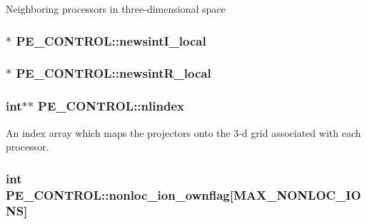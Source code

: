 Neighboring processors in three-\/dimensional space \hypertarget{struct_p_e___c_o_n_t_r_o_l_a4f6410bdeacd2bcf0fc6595132e09d6f}{
\subsubsection[{newsint\-I\-\_\-local}]{$\ast$ P\-E\-\_\-\-C\-O\-N\-T\-R\-O\-L\-::newsint\-I\-\_\-local}}\label{struct_p_e___c_o_n_t_r_o_l_a4f6410bdeacd2bcf0fc6595132e09d6f}
\hypertarget{struct_p_e___c_o_n_t_r_o_l_a88d05b79c516668169c7d9e6bf149ee9}{
\subsubsection[{newsint\-R\-\_\-local}]{$\ast$ P\-E\-\_\-\-C\-O\-N\-T\-R\-O\-L\-::newsint\-R\-\_\-local}}\label{struct_p_e___c_o_n_t_r_o_l_a88d05b79c516668169c7d9e6bf149ee9}
\hypertarget{struct_p_e___c_o_n_t_r_o_l_a63e99bcdf4ee1f938c02d986ed1d33e1}{
\subsubsection[{nlindex}]{\setlength{\rightskip}{0pt plus 5cm}int$\ast$$\ast$ P\-E\-\_\-\-C\-O\-N\-T\-R\-O\-L\-::nlindex}}\label{struct_p_e___c_o_n_t_r_o_l_a63e99bcdf4ee1f938c02d986ed1d33e1}
An index array which maps the projectors onto the 3-\/d grid associated with each processor. \hypertarget{struct_p_e___c_o_n_t_r_o_l_adc1f3d8409c3db6845d2ade134e939c1}{
\subsubsection[{nonloc\-\_\-ion\-\_\-ownflag}]{\setlength{\rightskip}{0pt plus 5cm}int P\-E\-\_\-\-C\-O\-N\-T\-R\-O\-L\-::nonloc\-\_\-ion\-\_\-ownflag\mbox{[}{\bf M\-A\-X\-\_\-\-N\-O\-N\-L\-O\-C\-\_\-\-I\-O\-N\-S}\mbox{]}}}\label{struct_p_e___c_o_n_t_r_o_l_adc1f3d8409c3db6845d2ade134e939c1}
